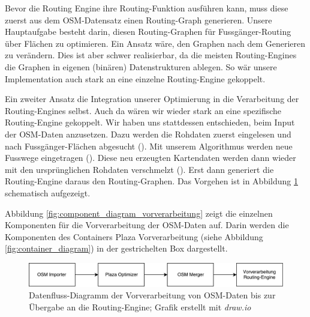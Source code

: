 Bevor die Routing Engine ihre Routing-Funktion ausführen kann, muss diese zuerst aus dem \ac{OSM}-Datensatz einen Routing-Graph generieren. Unsere Hauptaufgabe besteht darin, diesen Routing-Graphen für Fussgänger-Routing über Flächen zu optimieren. Ein Ansatz wäre, den Graphen nach dem Generieren zu verändern. Dies ist aber schwer realisierbar, da die meisten Routing-Engines die Graphen in eigenen (binären) Datenstrukturen ablegen. So wär unsere Implementation auch stark an eine einzelne Routing-Engine gekoppelt.

Ein zweiter Ansatz die Integration unserer Optimierung in die Verarbeitung der Routing-Engines selbst. Auch da wären wir wieder stark an eine spezifische Routing-Engine gekoppelt.
Wir haben uns stattdessen entschieden, beim Input der \ac{OSM}-Daten anzusetzen. Dazu werden die Rohdaten zuerst eingelesen und nach Fussgänger-Flächen abgesucht (). Mit unserem Algorithmus werden neue Fusswege eingetragen (). Diese neu erzeugten Kartendaten werden dann wieder mit den ursprünglichen Rohdaten verschmelzt (). Erst dann generiert die Routing-Engine daraus den Routing-Graphen. Das Vorgehen ist in Abbildung \ref{fig:dataflow_vorverarbeitung} schematisch aufgezeigt.

Abbildung \ref{fig:component_diagram_vorverarbeitung} zeigt die einzelnen Komponenten für die Vorverarbeitung der \ac{OSM}-Daten auf. Darin werden die Komponenten des Containers Plaza Vorverarbeitung (siehe Abbildung \ref{fig:container_diagram}) in der gestrichelten Box dargestellt.


\begin{figure}[ht]
    \centering
    \includegraphics[width=1\linewidth]{projectdoc/img/dataflow_vorverarbeitung.pdf}
    \caption[Datenfluss Vorverarbeitung]{Datenfluss-Diagramm der Vorverarbeitung von \ac{OSM}-Daten bis zur Übergabe an die Routing-Engine; Grafik erstellt mit \emph{draw.io}}
    \label{fig:dataflow_vorverarbeitung}
\end{figure}


